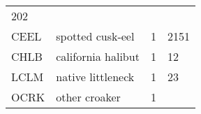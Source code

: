 \documentclass[]{article}
\begin{document}
\begin{longtable}[c]{@{}llll@{}}
\begin{minipage}[t]{0.23\columnwidth}
202
\end{minipage}
\\\addlinespace
\begin{minipage}[t]{0.08\columnwidth}\raggedright
CEEL
\end{minipage} & \begin{minipage}[t]{0.36\columnwidth}\raggedright
spotted cusk-eel
\end{minipage} & \begin{minipage}[t]{0.21\columnwidth}\raggedright
1
\end{minipage} & \begin{minipage}[t]{0.23\columnwidth}\raggedright
2151
\end{minipage}
\\\addlinespace
\begin{minipage}[t]{0.08\columnwidth}\raggedright
CHLB
\end{minipage} & \begin{minipage}[t]{0.36\columnwidth}\raggedright
california halibut
\end{minipage} & \begin{minipage}[t]{0.21\columnwidth}\raggedright
1
\end{minipage} & \begin{minipage}[t]{0.23\columnwidth}\raggedright
12
\end{minipage}
\\\addlinespace
\begin{minipage}[t]{0.08\columnwidth}\raggedright
LCLM
\end{minipage} & \begin{minipage}[t]{0.36\columnwidth}\raggedright
native littleneck
\end{minipage} & \begin{minipage}[t]{0.21\columnwidth}\raggedright
1
\end{minipage} & \begin{minipage}[t]{0.23\columnwidth}\raggedright
23
\end{minipage}
\\\addlinespace
\begin{minipage}[t]{0.08\columnwidth}\raggedright
OCRK
\end{minipage} & \begin{minipage}[t]{0.36\columnwidth}\raggedright
other croaker
\end{minipage} & \begin{minipage}[t]{0.21\columnwidth}\raggedright
1
\end{minipage} & \begin{minipage}[t]{0.23\columnwidth}\raggedright

\end{minipage}
\end{longtable}
\end{document}
